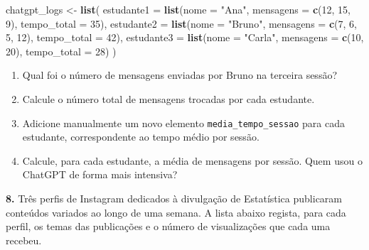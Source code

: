 \documentclass[
]{book}
\newenvironment{Shaded}{\begin{snugshade}}{\end{snugshade}}
\newcommand{\AttributeTok}[1]{\textcolor[rgb]{0.13,0.29,0.53}{#1}}
\newcommand{\DecValTok}[1]{\textcolor[rgb]{0.00,0.00,0.81}{#1}}
\newcommand{\FunctionTok}[1]{\textcolor[rgb]{0.13,0.29,0.53}{\textbf{#1}}}
\newcommand{\NormalTok}[1]{#1}
\newcommand{\OtherTok}[1]{\textcolor[rgb]{0.56,0.35,0.01}{#1}}
\newcommand{\StringTok}[1]{\textcolor[rgb]{0.31,0.60,0.02}{#1}}
\begin{document}
\begin{Shaded}
\begin{Highlighting}[]
\NormalTok{chatgpt\_logs }\OtherTok{\textless{}{-}} \FunctionTok{list}\NormalTok{(}
  \AttributeTok{estudante1 =} \FunctionTok{list}\NormalTok{(}\AttributeTok{nome =} \StringTok{"Ana"}\NormalTok{, }\AttributeTok{mensagens =} \FunctionTok{c}\NormalTok{(}\DecValTok{12}\NormalTok{, }\DecValTok{15}\NormalTok{, }\DecValTok{9}\NormalTok{), }\AttributeTok{tempo\_total =} \DecValTok{35}\NormalTok{),}
  \AttributeTok{estudante2 =} \FunctionTok{list}\NormalTok{(}\AttributeTok{nome =} \StringTok{"Bruno"}\NormalTok{, }\AttributeTok{mensagens =} \FunctionTok{c}\NormalTok{(}\DecValTok{7}\NormalTok{, }\DecValTok{6}\NormalTok{, }\DecValTok{5}\NormalTok{, }\DecValTok{12}\NormalTok{), }\AttributeTok{tempo\_total =} \DecValTok{42}\NormalTok{),}
  \AttributeTok{estudante3 =} \FunctionTok{list}\NormalTok{(}\AttributeTok{nome =} \StringTok{"Carla"}\NormalTok{, }\AttributeTok{mensagens =} \FunctionTok{c}\NormalTok{(}\DecValTok{10}\NormalTok{, }\DecValTok{20}\NormalTok{), }\AttributeTok{tempo\_total =} \DecValTok{28}\NormalTok{)}
\NormalTok{)}
\end{Highlighting}
\end{Shaded}

\begin{enumerate}
\def\labelenumi{(\alph{enumi})}
\item
  Qual foi o número de mensagens enviadas por Bruno na terceira sessão?
\item
  Calcule o número total de mensagens trocadas por cada estudante.
\item
  Adicione manualmente um novo elemento \texttt{media\_tempo\_sessao} para cada estudante, correspondente ao tempo médio por sessão.
\item
  Calcule, para cada estudante, a média de mensagens por sessão. Quem usou o ChatGPT de forma mais intensiva?
\end{enumerate}

\textbf{8.} Três perfis de Instagram dedicados à divulgação de Estatística publicaram conteúdos variados ao longo de uma semana. A lista abaixo regista, para cada perfil, os temas das publicações e o número de visualizações que cada uma recebeu.
\end{document}
